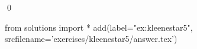 
\begin{ex} 
  \label{ex:kleenestar5}
  
  \qed
\end{ex} 
\begin{python0}
from solutions import *
add(label="ex:kleenestar5",
    srcfilename='exercises/kleenestar5/answer.tex') 
\end{python0}
